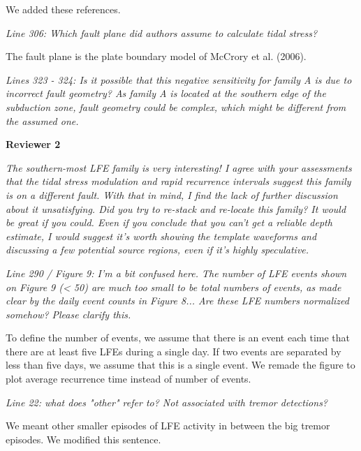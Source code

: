 \documentclass[letterpaper, 12pt]{article}
\begin{document}
\bigskip

We added these references.

\bigskip

\textit{Line 306: Which fault plane did authors assume to calculate tidal stress?}

\bigskip

The fault plane is the plate boundary model of McCrory et al. (2006).

\bigskip

\textit{Lines 323 - 324: Is it possible that this negative sensitivity for family A is due to incorrect fault geometry? As family A is located at the southern edge of the subduction zone, fault geometry could be complex, which might be different from the assumed one.}

\bigskip

\textbf{Reviewer 2}

\bigskip

\textit{The southern-most LFE family is very interesting! I agree with your assessments that the tidal stress modulation and rapid recurrence intervals suggest this family is on a different fault. With that in mind, I find the lack of further discussion about it unsatisfying. Did you try to re-stack and re-locate this family? It would be great if you could. Even if you conclude that you can't get a reliable depth estimate, I would suggest it's worth showing the template waveforms and discussing a few potential source regions, even if it's highly speculative.}

\bigskip

\textit{Line 290 / Figure 9: I'm a bit confused here. The number of LFE events shown on Figure 9 (< 50) are much too small to be total numbers of events, as made clear by the daily event counts in Figure 8... Are these LFE numbers normalized somehow? Please clarify this.} 

\bigskip

To define the number of events, we assume that there is an event each time that there are at least five LFEs during a single day. If two events are separated by less than five days, we assume that this is a single event. We remade the figure to plot average recurrence time instead of number of events.

\bigskip

\textit{Line 22: what does "other" refer to? Not associated with tremor detections?}

\bigskip

We meant other smaller episodes of LFE activity in between the big tremor episodes. We modified this sentence.
\end{document}
